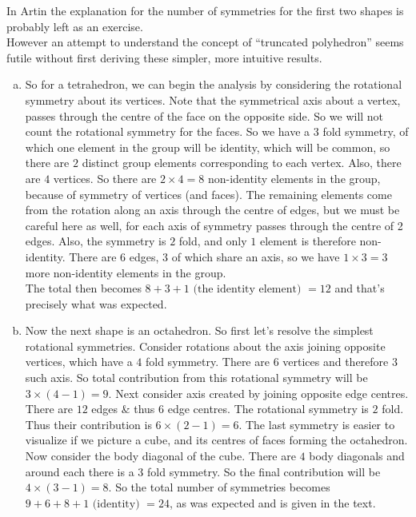 \documentclass[12pt]{article}
\begin{document}
In Artin the explanation for the number of symmetries for the first two shapes is probably left as an exercise.\\
However an attempt to understand the concept of ``truncated polyhedron'' seems futile without first deriving these simpler, more intuitive results.\\
\begin{enumerate}[(a)]
\item
So for a tetrahedron, we can begin the analysis by considering the rotational symmetry about its vertices. Note that the symmetrical axis about a vertex, passes through the centre of the face on the opposite side. So we will not count the rotational symmetry for the faces. So we have a $3$ fold symmetry, of which one element in the group will be identity, which will be common, so there are $2$ distinct group elements corresponding to each vertex. Also, there are $4$ vertices. So there are $2 \times 4 = 8$ non-identity elements in the group, because of symmetry of vertices (and faces). The remaining elements come from the rotation along an axis through the centre of edges, but we must be careful here as well, for each axis of symmetry passes through the centre of 2 edges. Also, the symmetry is $2$ fold, and only $1$ element is therefore non-identity. There are $6$ edges, $3$ of which share an axis, so we have $1 \times 3 = 3$ more non-identity elements in the group.\\
The total then becomes $8 + 3 + 1 \text{ (the identity element) } = 12$ and that's precisely what was expected.
\par
\item
Now the next shape is an octahedron. So first let's resolve the simplest rotational symmetries. Consider rotations about the axis joining opposite vertices, which have a $4$ fold symmetry. There are $6$ vertices and therefore $3$ such axis. So total contribution from this rotational symmetry will be $3 \times (4-1) = 9$. Next consider axis created by joining opposite edge centres. There are $12$ edges \& thus $6$ edge centres. The rotational symmetry is $2$ fold. Thus their contribution is $6 \times (2-1) = 6$. The last symmetry is easier to visualize if we picture a cube, and its centres of faces forming the octahedron. Now consider the body diagonal of the cube. There are $4$ body diagonals and around each there is a $3$ fold symmetry. So the final contribution will be $4 \times (3-1) = 8$. So the total number of symmetries becomes $9 + 6 + 8 + 1 \text { (identity) } = 24$, as was expected and is given in the text.

\end{enumerate}
\end{document}
